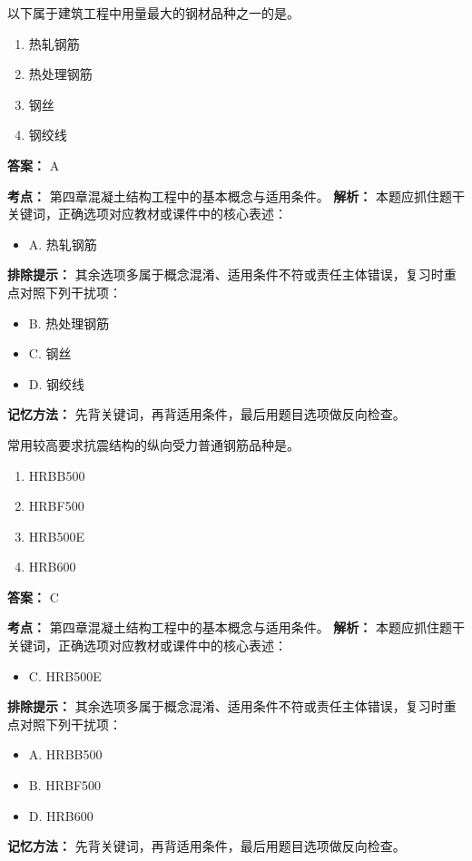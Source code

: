\documentclass[UTF8,fontset=fandol,11pt]{ctexart}
\begin{document}
\begin{quizbox}[title={第 1 题}]
以下属于建筑工程中用量最大的钢材品种之一的是。\\
\begin{enumerate}[label=\Alph*.]
\item 热轧钢筋
\item 热处理钢筋
\item 钢丝
\item 钢绞线
\end{enumerate}
\textbf{答案：} A
\vspace{0.25em}
\begin{answerbox}[title={考点解析}]
\textbf{考点：} 第四章混凝土结构工程中的基本概念与适用条件。
\textbf{解析：} 本题应抓住题干关键词，正确选项对应教材或课件中的核心表述：
\begin{itemize}
\item A. 热轧钢筋
\end{itemize}
\textbf{排除提示：} 其余选项多属于概念混淆、适用条件不符或责任主体错误，复习时重点对照下列干扰项：
\begin{itemize}
\item B. 热处理钢筋
\item C. 钢丝
\item D. 钢绞线
\end{itemize}
\textbf{记忆方法：} 先背关键词，再背适用条件，最后用题目选项做反向检查。
\end{answerbox}
\end{quizbox}

\begin{quizbox}[title={第 2 题}]
常用较高要求抗震结构的纵向受力普通钢筋品种是。\\
\begin{enumerate}[label=\Alph*.]
\item HRBB500
\item HRBF500
\item HRB500E
\item HRB600
\end{enumerate}
\textbf{答案：} C
\vspace{0.25em}
\begin{answerbox}[title={考点解析}]
\textbf{考点：} 第四章混凝土结构工程中的基本概念与适用条件。
\textbf{解析：} 本题应抓住题干关键词，正确选项对应教材或课件中的核心表述：
\begin{itemize}
\item C. HRB500E
\end{itemize}
\textbf{排除提示：} 其余选项多属于概念混淆、适用条件不符或责任主体错误，复习时重点对照下列干扰项：
\begin{itemize}
\item A. HRBB500
\item B. HRBF500
\item D. HRB600
\end{itemize}
\textbf{记忆方法：} 先背关键词，再背适用条件，最后用题目选项做反向检查。
\end{answerbox}
\end{quizbox}
\end{document}

